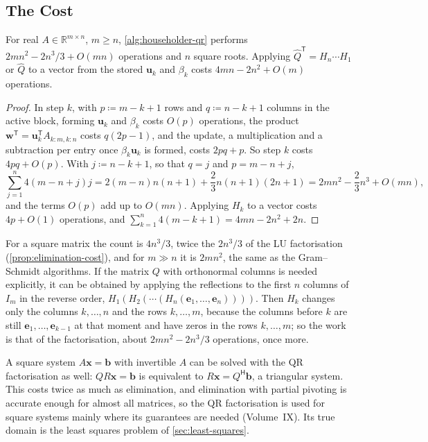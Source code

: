 \subsection{The Cost}

\begin{proposition}
\label{prop:householder-cost}
For real $A\in\mathbb R^{m\times n}$, $m\ge n$, \cref{alg:householder-qr} performs $2mn^2-2n^3/3+O(mn)$ operations and $n$ square roots. Applying $\hat Q^{\mathsf T}=H_n\cdots H_1$ or $\hat Q$ to a vector from the stored $\mathbf u_k$ and $\beta_k$ costs $4mn-2n^2+O(m)$ operations.
\end{proposition}

\begin{proof}
In step $k$, with $p\coloneqq m-k+1$ rows and $q\coloneqq n-k+1$ columns in the active block, forming $\mathbf u_k$ and $\beta_k$ costs $O(p)$ operations, the product $\mathbf w^{\mathsf T}=\mathbf u_k^{\mathsf T}A_{k:m,k:n}$ costs $q(2p-1)$, and the update, a multiplication and a subtraction per entry once $\beta_k\mathbf u_k$ is formed, costs $2pq+p$. So step $k$ costs $4pq+O(p)$. With $j\coloneqq n-k+1$, so that $q=j$ and $p=m-n+j$,
\[
\sum_{j=1}^n4(m-n+j)j=2(m-n)n(n+1)+\frac23n(n+1)(2n+1)=2mn^2-\frac23n^3+O(mn),
\]
and the terms $O(p)$ add up to $O(mn)$. Applying $H_k$ to a vector costs $4p+O(1)$ operations, and $\sum_{k=1}^n4(m-k+1)=4mn-2n^2+2n$.
\end{proof}

For a square matrix the count is $4n^3/3$, twice the $2n^3/3$ of the LU factorisation (\cref{prop:elimination-cost}), and for $m\gg n$ it is $2mn^2$, the same as the Gram--Schmidt algorithms. If the matrix $Q$ with orthonormal columns is needed explicitly, it can be obtained by applying the reflections to the first $n$ columns of $I_m$ in the reverse order, $H_1(H_2(\cdots(H_n(\mathbf e_1,\ldots,\mathbf e_n))))$. Then $H_k$ changes only the columns $k,\ldots,n$ and the rows $k,\ldots,m$, because the columns before $k$ are still $\mathbf e_1,\ldots,\mathbf e_{k-1}$ at that moment and have zeros in the rows $k,\ldots,m$; so the work is that of the factorisation, about $2mn^2-2n^3/3$ operations, once more.

A square system $A\mathbf x=\mathbf b$ with invertible $A$ can be solved with the QR factorisation as well: $QR\mathbf x=\mathbf b$ is equivalent to $R\mathbf x=Q^{\mathsf H}\mathbf b$, a triangular system. This costs twice as much as elimination, and elimination with partial pivoting is accurate enough for almost all matrices, so the QR factorisation is used for square systems mainly where its guarantees are needed (Volume~IX). Its true domain is the least squares problem of \cref{sec:least-squares}.

